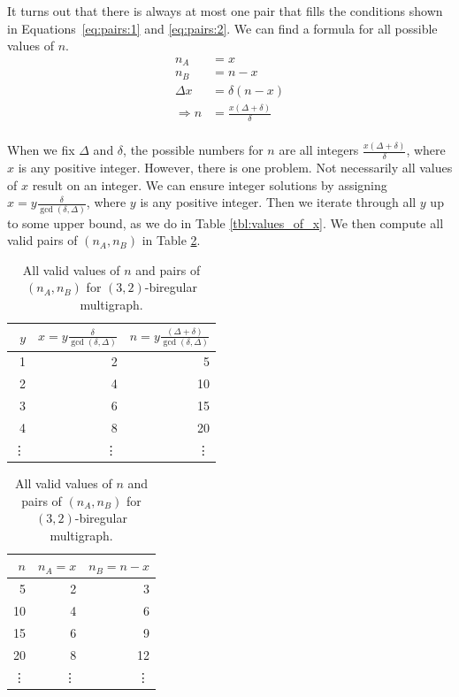 It turns out that there is always at most one pair that fills the conditions shown in Equations~\ref{eq:pairs:1} and \ref{eq:pairs:2}.
We can find a formula for all possible values of $n$.
\begin{align*}
  n_A &= x \\
  n_B &= n-x\\
  \Delta x &= \delta (n-x) \\
  \Rightarrow n&=\frac{x(\Delta+\delta)}{\delta}\\
\end{align*}

When we fix $\Delta$ and $\delta$, the possible numbers for $n$ are all integers $\frac{x(\Delta + \delta)}{\delta}$, where $x$ is any positive integer.
However, there is one problem.
Not necessarily all values of $x$ result on an integer.
We can ensure integer solutions by assigning $x=y\frac{\delta}{\gcd(\delta, \Delta)}$, where $y$ is any positive integer.
Then we iterate through all $y$ up to some upper bound, as we do in Table \ref{tbl:values_of_x}.
We then compute all valid pairs of $(n_A, n_B)$ in Table \ref{tbl:valid_pairs}.

\begin{table}[H]
  \parbox{.45\linewidth}{
  \centering
  \begin{tabular}{rrr}
    \toprule
    $y$&$x=y\frac{\delta}{\gcd(\delta, \Delta)}$&$n=y\frac{(\Delta + \delta)}{\gcd(\delta, \Delta)}$\\
    \midrule
    1 & 2 & 5 \\
    2 & 4 & 10 \\
    3 & 6 & 15 \\
    4 & 8 & 20 \\
    \vdots & \vdots & \vdots \\
    \bottomrule
  \end{tabular}
  \caption{
    All values of $y$, $x$, and $n$ for $(3,2)$-biregular multigraph.
  }
  \label{tbl:values_of_x}
  }
  \hfill
  \parbox{.45\linewidth}{
  \centering
  \begin{tabular}{rrr}
    \toprule
    $n$&$n_A=x$&$n_B=n-x$\\
    \midrule
    5 & 2 & 3   \\
    10 & 4 & 6  \\
    15 & 6 & 9  \\
    20 & 8 & 12 \\
    \vdots & \vdots & \vdots\\
    \bottomrule
  \end{tabular}
  \caption{
    All valid values of $n$ and pairs of $(n_A, n_B)$ for $(3,2)$-biregular multigraph.
  }
  \label{tbl:valid_pairs}
  }
\end{table}


